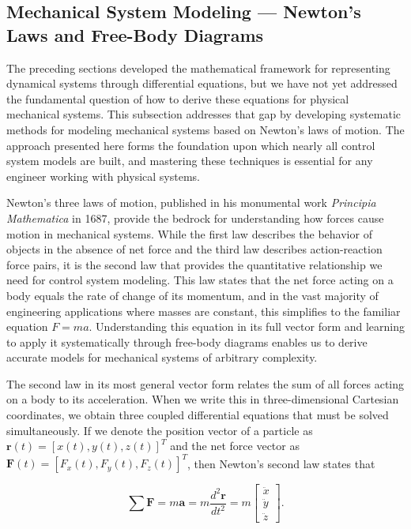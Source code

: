\subsection{Mechanical System Modeling — Newton's Laws and Free-Body Diagrams}

The preceding sections developed the mathematical framework for representing dynamical systems through differential equations, but we have not yet addressed the fundamental question of how to derive these equations for physical mechanical systems. This subsection addresses that gap by developing systematic methods for modeling mechanical systems based on Newton's laws of motion. The approach presented here forms the foundation upon which nearly all control system models are built, and mastering these techniques is essential for any engineer working with physical systems.

Newton's three laws of motion, published in his monumental work \textit{Principia Mathematica} in 1687, provide the bedrock for understanding how forces cause motion in mechanical systems. While the first law describes the behavior of objects in the absence of net force and the third law describes action-reaction force pairs, it is the second law that provides the quantitative relationship we need for control system modeling. This law states that the net force acting on a body equals the rate of change of its momentum, and in the vast majority of engineering applications where masses are constant, this simplifies to the familiar equation $F = ma$. Understanding this equation in its full vector form and learning to apply it systematically through free-body diagrams enables us to derive accurate models for mechanical systems of arbitrary complexity.

The second law in its most general vector form relates the sum of all forces acting on a body to its acceleration. When we write this in three-dimensional Cartesian coordinates, we obtain three coupled differential equations that must be solved simultaneously. If we denote the position vector of a particle as $\mathbf{r}(t) = [x(t), y(t), z(t)]^T$ and the net force vector as $\mathbf{F}(t) = [F_x(t), F_y(t), F_z(t)]^T$, then Newton's second law states that

\[
\sum \mathbf{F} = m\mathbf{a} = m\frac{d^2\mathbf{r}}{dt^2} = m\begin{bmatrix} \ddot{x} \\ \ddot{y} \\ \ddot{z} \end{bmatrix}.
\]

